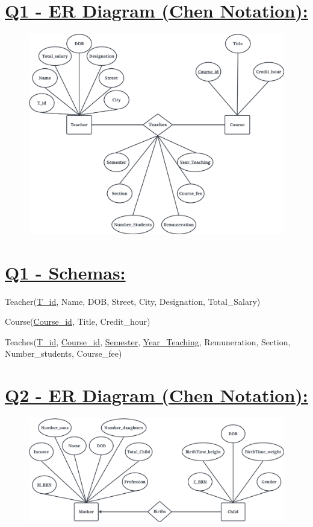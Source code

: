 \documentclass[a4paper, 12pt]{article}
\begin{document}
\section{\textbf{\uline{Q1 - ER Diagram (Chen Notation):}}}
\begin{figure}
    \centering
    \includegraphics[width=1\linewidth]{Q1.jpeg}
\end{figure}


\section{\textbf{\uline{Q1 - Schemas:}}}
Teacher(\uline{T{\_}id}, Name, DOB, Street, City, Designation, Total{\_}Salary)

Course(\uline{Course{\_}id}, Title, Credit{\_}hour)

Teaches(\uline{T{\_}id}, \uline{Course{\_}id}, \uline{Semester}, \uline{Year\_Teaching}, Remuneration, Section, Number\_students, Course\_fee)


\break
\section{\textbf{\uline{Q2 - ER Diagram (Chen Notation):}}}
\begin{figure}
    \centering
    \includegraphics[width=1\linewidth]{Q2.jpeg}
    
    
\end{figure}
\end{document}
